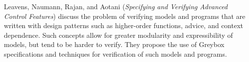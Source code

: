 


Leavens, Naumann, Rajan, and Aotani
\cite{isola-2016-leavens}
({\em Specifying and Verifying Advanced Control Features})
discuss the problem of verifying models and programs that are written with design patterns such as higher-order functions, advice, and context dependence. Such concepts allow for greater modularity and expressibility of models, but tend to be harder to verify. They propose the use of Greybox specifications and techniques for verification of such models and programs. 

